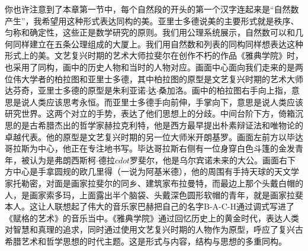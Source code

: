 \documentclass[UTF8]{article}
\begin{document}
你也许注意到了本章第一节中，每个自然段的开头的第一个汉字连起来是“自然数产生”，我希望用这种形式表达同构的美。亚里士多德说美的主要形式就是秩序、匀称和确定性，这些正是数学研究的原则。我们用公理系统展示，自然数可以和几何同样建立在五条公理组成的大厦上。我们用自然数和列表的同构同样想表达这种形式上的美。文艺复兴时期的艺术大师拉斐尔在创作不朽的作品《雅典学院》时，也采用了同构，画中的历史人物和当时的人物对应。画面中心面向我们走来的是两位伟大学者的柏拉图和亚里士多德，其中柏拉图的原型是文艺复兴时期的艺术大师达芬奇，亚里士多德的原型是朱利亚诺$\cdot$达$\cdot$桑加洛。画中的柏拉图右手向上指，意思是说人类应该思考永恒。而亚里士多德手向前伸，手掌向下，意思是说人类应该研究世界。这两个对立的手势，表达了他们思想上的分歧。中间台阶下方，倚箱沉思的是古希腊杰出的哲学家赫拉克利特，他是西方最早提出朴素辩证法和唯物论的卓越代表。他的原型是文艺复兴时期的另一位大师米开朗基罗。画面左前方以毕达哥拉斯为中心，他正在专注地书写。毕达哥拉斯右侧有一位身穿白色斗篷的金发青年，被认为是弗朗西斯柯$\cdot$德拉$cdot$罗斐尔，他是乌尔宾诺未来的大公。画面右下方中心是手拿圆规的欧几里得（一说为阿基米德），他的周围有手持天球的天文学家托勒密，对面是画家拉斐尔的同乡、建筑家布拉曼特，而最边上那个头戴白帽的人，是画家索多玛，上面露出半个脑袋、头戴深色圆形软帽的青年，就是画家拉斐本人。这让人联想起了伟大的音乐家巴赫把自己的名字B-A-C-H通过调式写进了《赋格的艺术》的音乐当中。《雅典学院》通过回忆历史上的黄金时代，表达人类对智慧和真理的追求，同时通过使用文艺复兴时期的人物作为原型，呼应了复兴古希腊艺术和哲学思想的时代主题。这是形式与内容，结构与思想的多重同构。

\begin{Exercise}
\end{Exercise}
\end{document}
